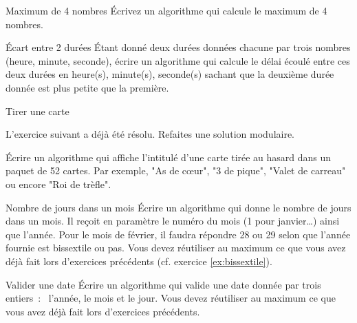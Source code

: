 	\begin{Exercice}{Maximum de 4 nombres}
		Écrivez un algorithme qui calcule le maximum de 4 nombres.
	\end{Exercice}

	\begin{Exercice}{Écart entre 2 durées}
		Étant donné deux durées données chacune par trois
		nombres (heure, minute, seconde),
		écrire un algorithme qui calcule
		le délai écoulé entre ces deux durées en heure(s), minute(s),
		seconde(s) sachant que la deuxième durée donnée 
		est plus petite que la première.
	\end{Exercice}

	\begin{comment}
	\begin{Exercice}{Réussir GEN1}
		Reprenons l’exercice \vref{algo:réussirGEN1}.
		Cette fois-ci on ne veut rien afficher
		mais fournir deux résultats~:
		un booléen indiquant si l’étudiant a réussi ou pas
		et un entier indiquant sa cote (qui n’a de sens que s’il a réussi). 
	\end{Exercice}
	\end{comment}

	\begin{Exercice}{Tirer une carte}

		L’exercice suivant a déjà été résolu. 
		Refaites une solution modulaire.

		Écrire un algorithme qui affiche l’intitulé d’une carte
		tirée au hasard dans un paquet de 52 cartes.
		Par exemple, "As de cœur", "3 de pique", "Valet de carreau"
		ou encore "Roi de trèfle".
	\end{Exercice}

	\begin{Exercice}{Nombre de jours dans un mois}
		Écrire un algorithme qui donne le nombre de jours dans un mois.
		Il reçoit en paramètre le numéro du mois (1 pour janvier\dots)
		ainsi que l’année.
		Pour le mois de février, 
		il faudra répondre 28 ou 29 selon que l’année fournie
		est bissextile ou pas.
		Vous devez réutiliser au maximum ce que vous avez déjà fait
		lors d’exercices précédents (cf. exercice \vref{ex:bissextile}).
	\end{Exercice}

	\begin{Exercice}{Valider une date}
		Écrire un algorithme qui valide 
		une date donnée par trois entiers~:~ l’année, le mois et le jour.
		Vous devez réutiliser au maximum ce que vous avez déjà fait
		lors d’exercices précédents.
	\end{Exercice}

